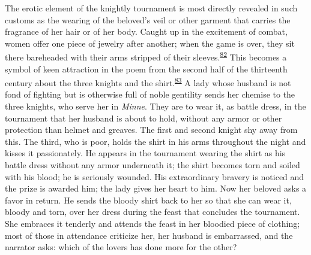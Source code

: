The erotic element of the knightly tournament is most directly revealed
in such customs as the wearing of the beloved's veil or other garment
that carries the fragrance of her hair or of her body. Caught up in the
excitement of combat, women offer one piece of jewelry after another;
when the game is over, they sit there bareheaded with their arms
stripped of their
sleeves.\textsuperscript{\protect\hypertarget{10_Chapter_Three__THE_HEROIC_DREAM.xhtmlux5cux23id_1770}{\protect\hyperlink{23_NOTES.xhtmlux5cux23id_1771}{82}}}
This becomes a symbol of keen attraction in the poem from the second
half of the thirteenth century about the three knights and the
shirt.\textsuperscript{\protect\hypertarget{10_Chapter_Three__THE_HEROIC_DREAM.xhtmlux5cux23id_1768}{\protect\hyperlink{23_NOTES.xhtmlux5cux23id_1769}{83}}}
A lady whose husband is not fond of fighting but is otherwise full of
noble gentility sends her chemise to the three knights, who serve her in
\emph{Minne}. They are to wear it, as battle dress, in the tournament
that her husband is about to hold, without any armor or other protection
than helmet and greaves. The first and second knight shy away from this.
The third, who is poor, holds the shirt in his arms throughout the night
and kisses it passionately. He appears in the tournament wearing the
shirt as his battle dress without any armor underneath it; the shirt
becomes torn and soiled with his blood; he is seriously wounded. His
extraordinary bravery is noticed and the prize is awarded him; the lady
gives her heart to him. Now her beloved asks a favor in return. He sends
the bloody shirt back to her so that she can wear it, bloody and torn,
over her dress during the feast that concludes the tournament. She
embraces it tenderly and attends the feast in her bloodied piece of
clothing; most of those in attendance criticize her, her husband is
embarrassed, and the narrator asks: which of the lovers has done more
for the other?

